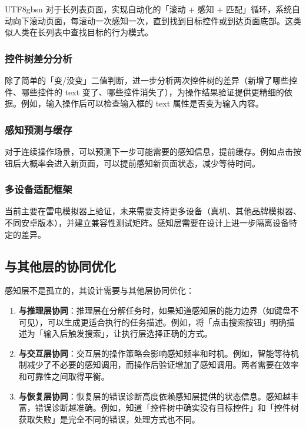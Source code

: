 \documentclass{article}
\begin{document}
\begin{CJK}{UTF8}{gbsn}
对于长列表页面，实现自动化的「滚动 + 感知 + 匹配」循环，系统自动向下滚动页面，每滚动一次感知一次，直到找到目标控件或到达页面底部。这类似人类在长列表中查找目标的行为模式。

\subsubsection{控件树差分分析}

除了简单的「变/没变」二值判断，进一步分析两次控件树的差异（新增了哪些控件、哪些控件的 text 变了、哪些控件消失了），为操作结果验证提供更精细的依据。例如，输入操作后可以检查输入框的 text 属性是否变为输入内容。

\subsubsection{感知预测与缓存}

对于连续操作场景，可以预测下一步可能需要的感知信息，提前缓存。例如点击按钮后大概率会进入新页面，可以提前感知新页面状态，减少等待时间。

\subsubsection{多设备适配框架}

当前主要在雷电模拟器上验证，未来需要支持更多设备（真机、其他品牌模拟器、不同安卓版本），并建立兼容性测试矩阵。感知层需要在设计上进一步隔离设备特定的差异。

\subsection{与其他层的协同优化}

感知层不是孤立的，其设计需要与其他层协同优化：

\begin{enumerate}[leftmargin=1.5em]
  \item \textbf{与推理层协同}：推理层在分解任务时，如果知道感知层的能力边界（如键盘不可见），可以生成更适合执行的任务描述。例如，将「点击搜索按钮」明确描述为「输入后触发搜索」，让执行层选择正确的方式。
  \item \textbf{与交互层协同}：交互层的操作策略会影响感知频率和时机。例如，智能等待机制减少了不必要的感知调用，而操作后验证增加了感知调用。两者需要在效率和可靠性之间取得平衡。
  \item \textbf{与恢复层协同}：恢复层的错误诊断高度依赖感知层提供的状态信息。感知越丰富，错误诊断越准确。例如，知道「控件树中确实没有目标控件」和「控件树获取失败」是完全不同的错误，处理方式也不同。
\end{enumerate}


\end{CJK}
\end{document}
